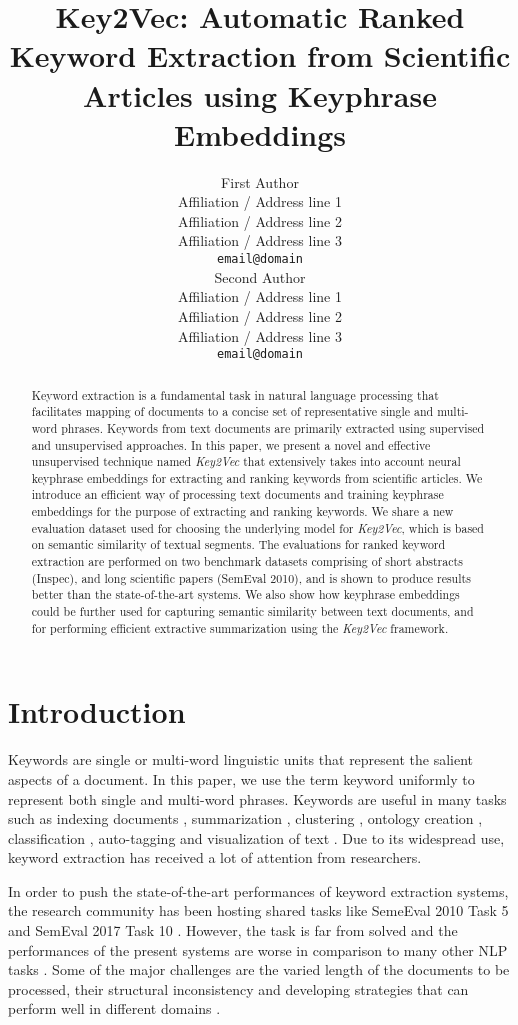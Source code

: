 \documentclass[11pt,a4paper]{article}
\title{Key2Vec: Automatic Ranked Keyword Extraction from Scientific Articles using Keyphrase Embeddings}
\author{First Author \\
  Affiliation / Address line 1 \\
  Affiliation / Address line 2 \\
  Affiliation / Address line 3 \\
  {\tt email@domain} \\\And
  Second Author \\
  Affiliation / Address line 1 \\
  Affiliation / Address line 2 \\
  Affiliation / Address line 3 \\
  {\tt email@domain} \\}
\date{}
\begin{document}
\maketitle
\begin{abstract}
Keyword extraction is a fundamental task in natural language processing that facilitates mapping of documents to a concise set of representative single and multi-word phrases. Keywords from text documents are primarily extracted using supervised and unsupervised approaches. In this paper, we present a novel and effective unsupervised technique named \textit{Key2Vec} that extensively takes into account neural keyphrase embeddings for extracting and ranking keywords from scientific articles. We introduce an efficient way of processing text documents and training keyphrase embeddings for the purpose of extracting and ranking keywords. We share a new evaluation dataset used for choosing the underlying model for \textit{Key2Vec}, which is based on semantic similarity of textual segments.  The evaluations for ranked keyword extraction are performed on two benchmark datasets comprising of short abstracts (Inspec), and long scientific papers (SemEval 2010), and is shown to produce results better than the state-of-the-art systems. We also show how keyphrase embeddings could be further used for capturing semantic similarity between text documents, and for performing efficient extractive summarization using the \textit{Key2Vec} framework.

\end{abstract}

\section{Introduction}
Keywords are single or multi-word linguistic units that represent the salient aspects of a document. In this paper, we use the term
keyword uniformly to represent both single and multi-word phrases. Keywords are useful in many tasks
such as indexing documents \cite{gutwin1999improving}, summarization \cite{litvak2008graph}, clustering \cite{hammouda2005corephrase}, ontology creation \cite{gulla2007ontology}, classification \cite{hulth2006study}, auto-tagging \cite{wu2010automatic} and visualization of text \cite{collins2009parallel}. Due to its widespread use, keyword extraction has received a lot of attention from researchers.

In order to push the state-of-the-art performances of keyword extraction systems, the research community has been hosting shared tasks like SemeEval 2010 Task 5 \cite{kim2010semeval} and SemEval 2017 Task 10 \cite{augenstein2017semeval}. However, the task is far from solved and the performances of the present systems are worse in comparison to many other NLP tasks \cite{liu2010automatic}. Some of the major challenges are the varied length of the documents to be processed, their structural inconsistency and developing strategies that can perform well in different domains \cite{hasan2014automatic}.
\end{document}
